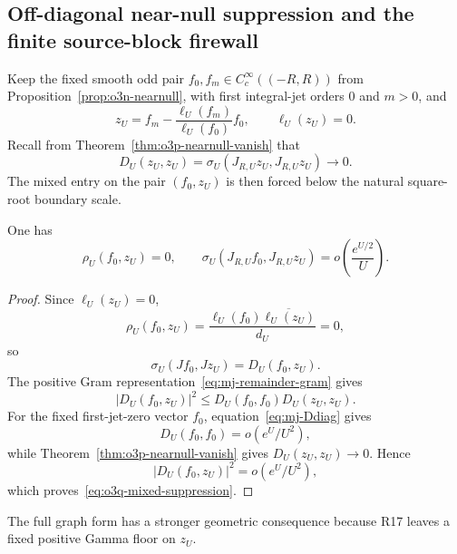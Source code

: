 
\subsection{Off-diagonal near-null suppression and the finite source-block firewall}
\label{subsec:o3q-offdiagonal-nearnull}

Keep the fixed smooth odd pair $f_0,f_m\in C_c^\infty((-R,R))$ from
Proposition~\ref{prop:o3n-nearnull}, with first integral-jet orders $0$ and $m>0$, and
\[
 z_U=f_m-\frac{\ell_U(f_m)}{\ell_U(f_0)}f_0,
 \qquad \ell_U(z_U)=0.
\]
Recall from Theorem~\ref{thm:o3p-nearnull-vanish} that
\[
 D_U(z_U,z_U)=\sigma_U(J_{R,U}z_U,J_{R,U}z_U)\to0.
\]
The mixed entry on the pair $(f_0,z_U)$ is then forced below the natural square-root
boundary scale.

\begin{theorem}\label{thm:o3q-mixed-suppression}
One has
\[
 \boxed{
 \rho_U(f_0,z_U)=0,
 \qquad
 \sigma_U(J_{R,U}f_0,J_{R,U}z_U)
 =o\!\left(\frac{e^{U/2}}{U}\right).
 }
\tag{O3Q.1}\label{eq:o3q-mixed-suppression}
\]
\end{theorem}

\begin{proof}
Since $\ell_U(z_U)=0$,
\[
 \rho_U(f_0,z_U)
 =\frac{\ell_U(f_0)\overline{\ell_U(z_U)}}{d_U}=0,
\]
so
\[
 \sigma_U(Jf_0,Jz_U)=D_U(f_0,z_U).
\]
The positive Gram representation~\eqref{eq:mj-remainder-gram} gives
\[
 |D_U(f_0,z_U)|^2
 \le D_U(f_0,f_0)D_U(z_U,z_U).
\]
For the fixed first-jet-zero vector $f_0$, equation~\eqref{eq:mj-Ddiag} gives
\[
 D_U(f_0,f_0)=o(e^U/U^2),
\]
while Theorem~\ref{thm:o3p-nearnull-vanish} gives
$D_U(z_U,z_U)\to0$.  Hence
\[
 |D_U(f_0,z_U)|^2=o(e^U/U^2),
\]
which proves~\eqref{eq:o3q-mixed-suppression}.
\end{proof}

The full graph form has a stronger geometric consequence because R17 leaves a fixed
positive Gamma floor on $z_U$.

